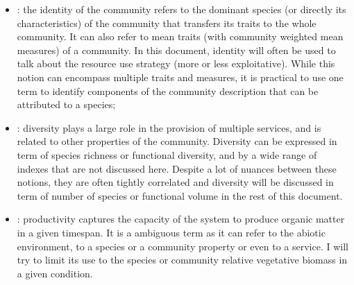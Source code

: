 \begin{itemize}
\item {}: the identity of the community refers to the dominant species (or directly its characteristics) of the community that transfers its traits to the whole community. It can also refer to mean traits (with community weighted mean measures) of a community. In this document, identity will often be used to talk about the resource use strategy (more or less exploitative). While this notion can encompass multiple traits and measures, it is practical to use one term to identify components of the community description that can be attributed to a species;
\item {}: diversity plays a large role in the provision of multiple services, and is related to other properties of the community. Diversity can be expressed in term of species richness or functional diversity, and by a wide range of indexes that are not discussed here. Despite a lot of nuances between these notions, they are often tightly correlated and diversity will be discussed in term of number of species or functional volume in the rest of this document.
\item {}: productivity captures the capacity of the system to produce organic matter in a given timespan. It is a ambiguous term as it can refer to the abiotic environment, to a species or a community property or even to a service. I will try to limit its use to the species or community relative vegetative biomass in a given condition.
\end{itemize}





